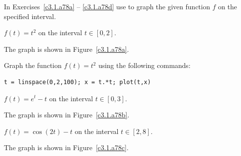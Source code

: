 \documentclass{ximera}
\begin{document}
\noindent In Exercises~\ref{c3.1.a78a} -- \ref{c3.1.a78d} use \Matlab
to graph the given function $f$ on the specified interval.
\begin{computerExercise} \label{c3.1.a78a}
$f(t) = t^2$ on the interval $t\in [0,2]$.

\begin{solution}

\ans The graph is shown in Figure~\ref{c3.1.a78a}.

\soln Graph the function $f(t) = t^2$ using the following \Matlab commands:
\begin{verbatim}
t = linspace(0,2,100); x = t.*t; plot(t,x)
\end{verbatim}

\end{solution}
\end{computerExercise}
\begin{computerExercise} \label{c3.1.a78b}
$f(t) = e^t-t$ on the interval $t\in [0,3]$.

\begin{solution}
The graph is shown in Figure~\ref{c3.1.a78b}.

\end{solution}
\end{computerExercise}
\begin{computerExercise} \label{c3.1.a78c}
$f(t) = \cos(2t)-t$ on the interval $t\in [2,8]$.

\begin{solution}
The graph is shown in Figure~\ref{c3.1.a78c}.

\end{solution}
\end{computerExercise}
\end{document}
